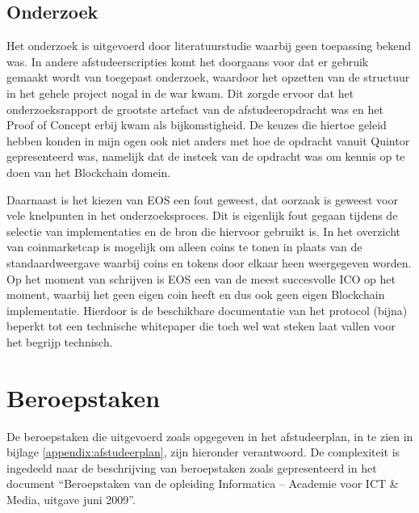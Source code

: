 \subsection{Onderzoek}

Het onderzoek is uitgevoerd door literatuurstudie waarbij geen toepassing bekend was. In andere afstudeerscripties komt het doorgaans voor dat er gebruik gemaakt wordt van toegepast onderzoek, waardoor het opzetten van de structuur in het gehele project nogal in de war kwam. Dit zorgde ervoor dat het onderzoeksrapport de grootste artefact van de afstudeeropdracht was en het Proof of Concept erbij kwam als bijkomstigheid. De keuzes die hiertoe geleid hebben konden in mijn ogen ook niet anders met hoe de opdracht vanuit Quintor gepresenteerd was, namelijk dat de insteek van de opdracht was om kennis op te doen van het Blockchain domein.

Daarnaast is het kiezen van EOS een fout geweest, dat oorzaak is geweest voor vele knelpunten in het onderzoeksproces. Dit is eigenlijk fout gegaan tijdens de selectie van implementaties en de bron die hiervoor gebruikt is. In het overzicht van coinmarketcap is mogelijk om alleen coins te tonen in plaats van de standaardweergave waarbij coins en tokens door elkaar heen weergegeven worden. Op het moment van schrijven is EOS een van de meest succesvolle \acrfull{ICO} op het moment, waarbij het geen eigen coin heeft en dus ook geen eigen Blockchain implementatie. Hierdoor is de beschikbare documentatie van het protocol (bijna) beperkt tot een technische whitepaper die toch wel wat steken laat vallen voor het begrijp technisch.

\section{Beroepstaken}

De beroepstaken die uitgevoerd zoals opgegeven in het afstudeerplan, in te zien in bijlage \ref{appendix:afstudeerplan}, zijn hieronder verantwoord. De complexiteit is ingedeeld naar de beschrijving van beroepstaken zoals gepresenteerd in het document ``Beroepstaken van de opleiding Informatica -- Academie voor ICT \& Media, uitgave juni 2009''.

